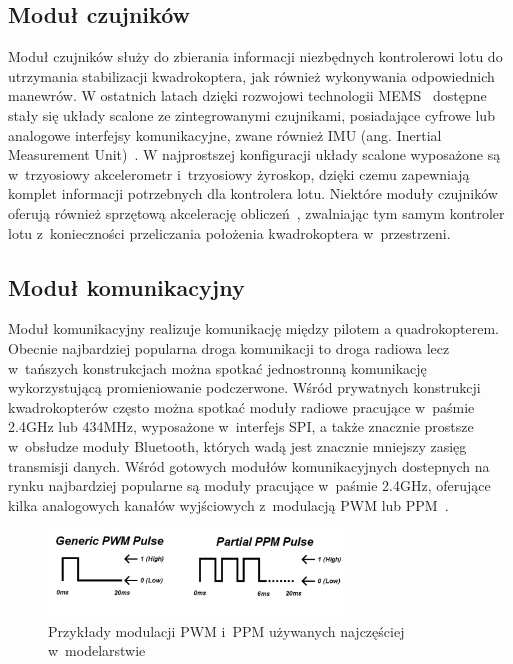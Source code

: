 \documentclass[11pt, twoside]{Thesis} %
\begin{document}
\subsection{Moduł czujników}

Moduł czujników służy do zbierania informacji niezbędnych kontrolerowi lotu do utrzymania stabilizacji kwadrokoptera, jak również wykonywania odpowiednich manewrów. W ostatnich latach dzięki rozwojowi technologii MEMS~\cite{mems1} dostępne stały się układy scalone ze zintegrowanymi czujnikami, posiadające cyfrowe lub analogowe interfejsy komunikacyjne, zwane również IMU (ang. Inertial Measurement Unit)~\cite{mems2}. W najprostszej konfiguracji układy scalone wyposażone są w~trzyosiowy akcelerometr i~trzyosiowy żyroskop, dzięki czemu zapewniają komplet informacji potrzebnych dla kontrolera lotu. Niektóre moduły czujników oferują również sprzętową akcelerację obliczeń~\cite{ds_mpu6050}, zwalniając tym samym kontroler lotu z~konieczności przeliczania położenia kwadrokoptera w~przestrzeni. 

\subsection{Moduł komunikacyjny}

Moduł komunikacyjny realizuje komunikację między pilotem a quadrokopterem. Obecnie najbardziej popularna droga komunikacji to droga radiowa lecz w~tańszych konstrukcjach można spotkać jednostronną komunikację wykorzystującą promieniowanie podczerwone. Wśród prywatnych konstrukcji kwadrokopterów często można spotkać moduły radiowe pracujące w~paśmie 2.4GHz lub 434MHz, wyposażone w~interfejs SPI, a także znacznie prostsze w~obsłudze moduły Bluetooth, których wadą jest znacznie mniejszy zasięg transmisji danych. Wśród gotowych modułów komunikacyjnych dostepnych na rynku najbardziej popularne są moduły pracujące w~paśmie 2.4GHz, oferujące kilka analogowych kanałów wyjściowych z~modulacją PWM lub PPM~\cite{quadro16,quadro17,quadro18,quadro19}. 

\begin{figure}[H]
	\centering
		\includegraphics[width=0.7\textwidth]{Pictures/quadrotor_controller_pwm_ppm.png}
	\caption[Przykłady modulacji w modelarstwie]{Przykłady modulacji PWM i~PPM używanych najczęściej w~modelarstwie}
	\label{fig:quadrotor_modules.png}
\end{figure}
\end{document}
